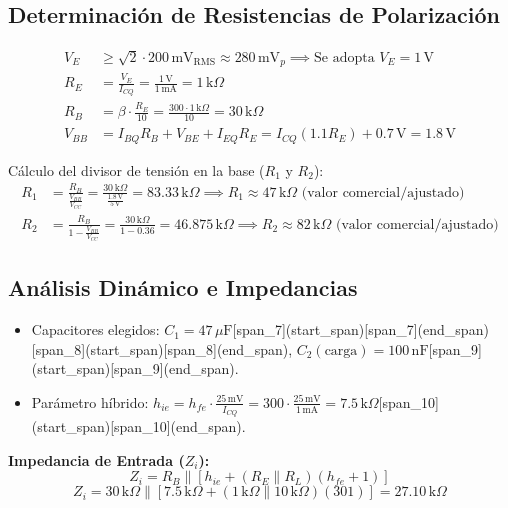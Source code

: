 \documentclass[12pt, a4paper]{article}
\begin{document}
\subsection{Determinación de Resistencias de Polarización}
\begin{align*}
V_E &\ge \sqrt{2} \cdot 200\,\text{mV}_{\text{RMS}} \approx 280\,\text{mV}_p \implies \text{Se adopta } V_E = 1\,\text{V} \\[0.5em]
R_E &= \frac{V_E}{I_{CQ}} = \frac{1\,\text{V}}{1\,\text{mA}} = 1\,\text{k}\Omega \\[0.5em]
R_B &= \beta \cdot \frac{R_E}{10} = \frac{300 \cdot 1\,\text{k}\Omega}{10} = 30\,\text{k}\Omega \\[0.5em]
V_{BB} &= I_{BQ} R_B + V_{BE} + I_{EQ} R_E = I_{CQ}(1.1 R_E) + 0.7\,\text{V} = 1.8\,\text{V}
\end{align*}

Cálculo del divisor de tensión en la base ($R_1$ y $R_2$):
\begin{align*}
R_1 &= \frac{R_B}{\frac{V_{BB}}{V_{CC}}} = \frac{30\,\text{k}\Omega}{\frac{1.8\,\text{V}}{5\,\text{V}}} = 83.33\,\text{k}\Omega \implies R_1 \approx 47\,\text{k}\Omega \text{ (valor comercial/ajustado)} \\[0.5em]
R_2 &= \frac{R_B}{1 - \frac{V_{BB}}{V_{CC}}} = \frac{30\,\text{k}\Omega}{1 - 0.36} = 46.875\,\text{k}\Omega \implies R_2 \approx 82\,\text{k}\Omega \text{ (valor comercial/ajustado)}
\end{align*}

\subsection{Análisis Dinámico e Impedancias}
\begin{itemize}
    \item Capacitores elegidos: $C_1 = 47\,\mu\text{F}$[span_7](start_span)[span_7](end_span)[span_8](start_span)[span_8](end_span), $C_2(\text{carga}) = 100\,\text{nF}$[span_9](start_span)[span_9](end_span).
    \item Parámetro híbrido: $h_{ie} = h_{fe} \cdot \frac{25\,\text{mV}}{I_{CQ}} = 300 \cdot \frac{25\,\text{mV}}{1\,\text{mA}} = 7.5\,\text{k}\Omega$[span_10](start_span)[span_10](end_span).
\end{itemize}

\textbf{Impedancia de Entrada ($Z_i$):}
\[
Z_i = R_B \parallel \left[ h_{ie} + (R_E \parallel R_L)(h_{fe} + 1) \right]
\]
\[
Z_i = 30\,\text{k}\Omega \parallel \left[ 7.5\,\text{k}\Omega + (1\,\text{k}\Omega \parallel 10\,\text{k}\Omega)(301) \right] = 27.10\,\text{k}\Omega
\]
\end{document}
